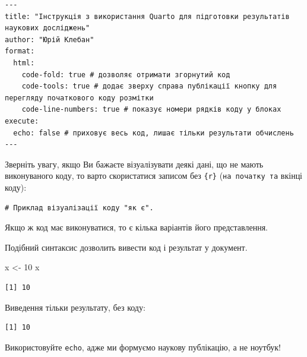 \documentclass[
  letterpaper,
  DIV=11,
  numbers=noendperiod]{scrartcl}
\newenvironment{Shaded}{\begin{snugshade}}{\end{snugshade}}
\newcommand{\DecValTok}[1]{\textcolor[rgb]{0.68,0.00,0.00}{#1}}
\newcommand{\NormalTok}[1]{\textcolor[rgb]{0.00,0.23,0.31}{#1}}
\newcommand{\OtherTok}[1]{\textcolor[rgb]{0.00,0.23,0.31}{#1}}
\begin{document}
\begin{verbatim}
---
title: "Інструкція з використання Quarto для підготовки результатів наукових досліджень"
author: "Юрій Клебан"
format: 
  html:
    code-fold: true # дозволяє отримати згорнутий код
    code-tools: true # додає зверху справа публікації кнопку для перегляду початкового коду розмітки
    code-line-numbers: true # показує номери рядків коду у блоках
execute:
  echo: false # приховує весь код, лишає тільки результати обчислень
---
\end{verbatim}

Зверніть увагу, якщо Ви бажаєте візуалізувати деякі дані, що не мають
виконуваного коду, то варто скористатися записом без \texttt{\{r\}}
(\texttt{на\ початку\ та} вкінці коду):

\begin{verbatim}
# Приклад візуалізації коду "як є".
\end{verbatim}

Якщо ж код має виконуватися, то є кілька варіантів його представлення.

Подібний синтаксис дозволить вивести код і результат у документ.

\begin{Shaded}
\begin{Highlighting}[numbers=left,,]
\NormalTok{x }\OtherTok{\textless{}{-}} \DecValTok{10}
\NormalTok{x}
\end{Highlighting}
\end{Shaded}

\begin{verbatim}
[1] 10
\end{verbatim}

Виведення тільки результату, без коду:

\begin{verbatim}
[1] 10
\end{verbatim}

\begin{tcolorbox}[enhanced jigsaw, coltitle=black, colback=white, opacitybacktitle=0.6, bottomtitle=1mm, colbacktitle=quarto-callout-note-color!10!white, bottomrule=.15mm, opacityback=0, toprule=.15mm, toptitle=1mm, breakable, titlerule=0mm, title=\textcolor{quarto-callout-note-color}{\faInfo}\hspace{0.5em}{Note}, arc=.35mm, leftrule=.75mm, left=2mm, colframe=quarto-callout-note-color-frame, rightrule=.15mm]
Використовуйте \texttt{echo}, адже ми формуємо наукову публікацію, а не
ноутбук!
\end{tcolorbox}
\end{document}
